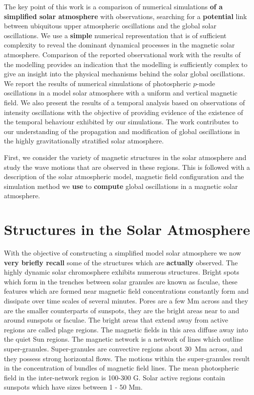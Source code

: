 \documentclass[physics,article,submit,pdftex,moreauthors]{Definitions/mdpi}
\begin{document}
The key point of this work is a comparison of numerical simulations {\bf of a simplified solar atmosphere} with observations, searching for a {\bf potential} link between ubiquitous upper atmospheric oscillations and the global solar oscillations. We use a {\bf simple} numerical representation that is of sufficient complexity to reveal the dominant dynamical processes in the magnetic solar atmosphere. Comparison of the reported observational work with the results of the modelling provides an indication that the modelling is sufficiently complex to give an insight into the physical mechanisms behind the solar global oscillations. We report the results of numerical simulations of photospheric $p$-mode oscillations in a model solar atmosphere with a uniform and vertical magnetic field. We also present the results of a temporal analysis based on observations of intensity oscillations with the objective of providing evidence of the existence of the temporal behaviour exhibited by our simulations. The work contributes to our understanding of the propagation and modification of global oscillations in the highly gravitationally stratified solar atmosphere. 



First, we consider the variety of magnetic structures in the solar atmosphere and study the wave motions that are observed in these regions. This is followed with a description of the solar atmospheric model, magnetic field configuration and the simulation method we {\bf use} to {\bf compute} global oscillations in a 
magnetic solar atmosphere.

\section{Structures in the Solar Atmosphere}

\label{sec:structures}

With the objective of constructing a simplified model solar atmosphere we now {\bf very briefly recall} some of the structures which are {\bf actually} observed. The highly dynamic solar chromosphere exhibits numerous structures. Bright spots which form in the trenches between solar granules are known as faculae, these features which are formed near magnetic field concentrations constantly form and dissipate over time scales of several minutes. Pores are a few Mm across and they are the smaller counterparts of sunspots, they are the bright areas near to and around sunspots or faculae. The bright areas that extend away from active regions are called plage regions.  The magnetic fields in this area diffuse away into the quiet Sun regions. The magnetic network is a network of lines which outline super-granules. Super-granules are convective regions about 30~Mm across, and they possess strong horizontal flows. The motions within the super-granules result in the concentration of bundles of magnetic field lines.  The mean photospheric field in the inter-network region is 100-300 G. Solar active regions contain sunspots which have sizes between  1 - 50 Mm. 
\end{document}
